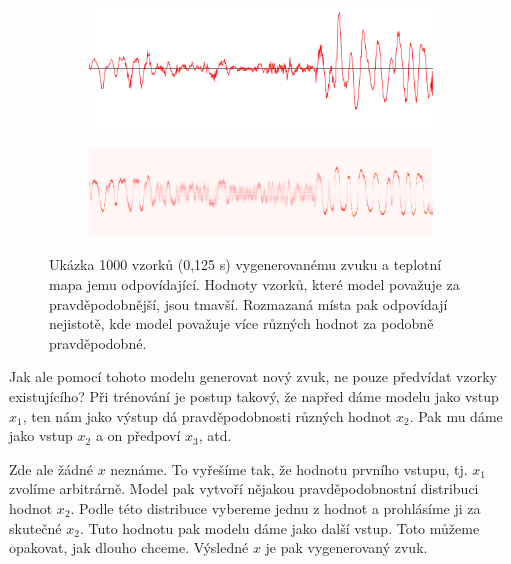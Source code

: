 \documentclass[a4]{article}
\begin{document}
\begin{figure}[h]
\centering
\begin{subfigure}{.5\textwidth}
\centering
\includegraphics[width=0.9\linewidth]{waveform_1}
\end{subfigure}%
\begin{subfigure}{.5\textwidth}
\centering
\includegraphics[width=0.9\linewidth]{heatmap_1_v2}
\end{subfigure}
\caption{Ukázka 1000 vzorků (0,125 s) vygenerovanému zvuku a teplotní mapa jemu odpovídající. Hodnoty vzorků, které model považuje za pravděpodobnější, jsou tmavší. Rozmazaná místa pak odpovídají nejistotě, kde model považuje více různých hodnot za podobně pravděpodobné. \protect \footnotemark}
\end{figure}


Jak ale pomocí tohoto modelu generovat nový zvuk, ne pouze předvídat vzorky existujícího? Při trénování je postup takový, že napřed dáme modelu jako vstup $x_1$, ten nám jako výstup dá pravděpodobnosti různých hodnot $x_2$. Pak mu dáme jako vstup $x_2$ a on předpoví $x_3$, atd.

Zde ale žádné $x$ neznáme. To vyřešíme tak, že hodnotu prvního vstupu, tj. $x_1$ zvolíme arbitrárně. Model pak vytvoří nějakou pravděpodobnostní distribuci hodnot $x_2$. Podle této distribuce vybereme jednu z hodnot a prohlásíme ji za skutečné $x_2$. Tuto hodnotu pak modelu dáme jako další vstup. Toto můžeme opakovat, jak dlouho chceme. Výsledné $x$ je pak vygenerovaný zvuk.
\end{document}
